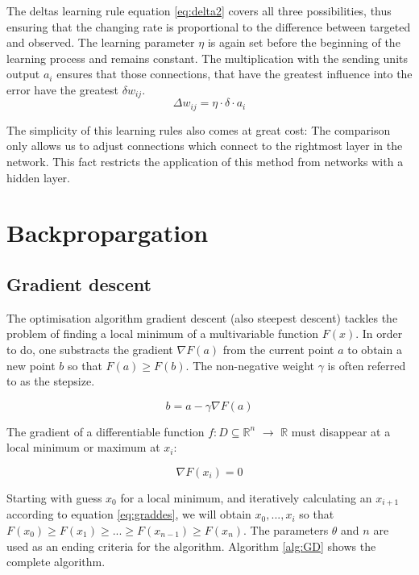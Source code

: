 \documentclass[10pt,a4paper,DIV=11]{scrreprt}
\begin{document}
The deltas learning rule equation \eqref{eq:delta2} covers all three possibilities, thus ensuring that the changing rate is proportional to the difference between targeted and observed. The learning parameter $\eta$ is again set before the beginning of the learning process and remains constant. The multiplication with the sending units output $a_i$ ensures that those connections, that have the greatest influence into the error have the greatest $\delta w_{ij}$.
\begin{equation}
\Delta w_{ij} = \eta \cdot \delta \cdot a_i
\label{eq:delta2}
\end{equation}

The simplicity of this learning rules also comes at great cost: The comparison only allows us to adjust connections which connect to the rightmost layer in the network. This fact restricts the application of this method from networks with a hidden layer. 

\section{Backpropargation}

\subsection{Gradient descent}

The optimisation algorithm gradient descent (also steepest descent) tackles the problem of finding a local minimum of a multivariable function $F(x)$. In order to do, one substracts the gradient $\nabla F(a)$ from the current point $a$ to obtain a new point $b$ so that $F(a) \geq F(b)$. The non-negative weight $\gamma$ is often referred to as the stepsize.

\begin{equation}
 b = a - \gamma \nabla F(a)
\label{eq:graddes}
\end{equation} 

The gradient of a differentiable function $f: D \subseteq \mathds{R}^n$ $\rightarrow$ $\mathds{R}$ must disappear at a local minimum or maximum at $x_i$:\cite{MATHINF}

\begin{equation}
\nabla F(x_i) = 0
\end{equation} 

Starting with guess $x_0$ for a local minimum, and iteratively calculating an $x_{i+1}$ according to equation \eqref{eq:graddes}, we will obtain $x_0, ..., x_i$ so that $F(x_0) \geq F(x_1) \geq ... \geq F(x_{n-1}) \geq F(x_n)$. The parameters $\theta$ and $n$ are  used as an ending criteria for the algorithm. Algorithm \ref{alg:GD} shows the complete algorithm.
\end{document}
